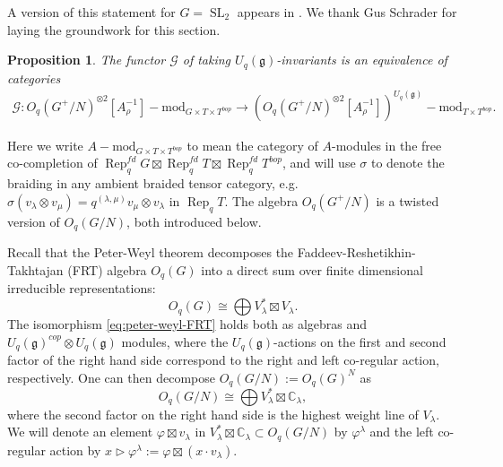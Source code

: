 \documentclass[a4paper]{article}
\numberwithin{equation}{section}
\newtheorem{proposition}[counter]{Proposition}
\newcommand{\1}{{\mathrm{1}\mkern-4mu{\mathchoice{}{}{\mskip-0.5mu}{\mskip-1mu}}\mathrm{l}}}
\DeclareMathOperator{\Rep}{Rep}
\DeclareMathOperator{\SL}{SL}
\newcommand{\g}{\mathfrak{g}}
\renewcommand{\mod}{\mathrm{mod}}
\begin{document}
A version of this statement for $G = \SL_2$ appears in \cite[Theorem 3.63]{JLSS2021}. We thank Gus Schrader for laying the groundwork for this section.
\begin{proposition}\label{prop:G-invariants-equivalence}
    The functor $\mathcal{G}$ of taking $U_q(\g)$-invariants is an equivalence of categories
    \begin{equation}
        \begin{aligned}
        \mathcal{G}: O_q(G^+/N)^{\otimes2}[A_\rho^{-1}]-\mod_{G\times T\times T^{bop}} \to  (O_q(G^+/N)^{\otimes2}[A_\rho^{-1}])^{U_q(\g)}-\mod_{T\times T^{bop}}.
    \end{aligned}
    \end{equation}
\end{proposition}
Here we write $A-\mod_{G\times T \times T^{bop}}$ to mean the category of $A$-modules in the free co-completion of $\Rep
_q^{fd}G\boxtimes \Rep_q^{fd}T \boxtimes \Rep_q^{fd}T^{bop}$, and will use $\sigma$ to denote the braiding in any ambient braided tensor category, e.g. $\sigma(v_\lambda \otimes v_\mu) = q^{(\lambda,\mu)}v_\mu \otimes v_\lambda$ in $\Rep_qT$.
The algebra $O_q(G^+/N)$ is a twisted version of $O_q(G/N)$, both introduced below.

Recall that the Peter-Weyl theorem decomposes the Faddeev-Reshetikhin-Takhtajan (FRT) algebra $O_q(G)$ into a direct sum over finite dimensional irreducible representations:
\begin{equation}\label{eq:peter-weyl-FRT}
     O_q(G) \cong \bigoplus V_\lambda^* \boxtimes V_\lambda.
\end{equation}
The isomorphism \eqref{eq:peter-weyl-FRT} holds both as algebras and $U_q(\g)^{cop}\otimes U_q(\g)$ modules, where the $U_q(\g)$-actions on the first and second factor of the right hand side correspond to the right and left co-regular action, respectively.
One can then decompose $O_q(G/N) := O_q(G)^N$ as
\begin{equation}
    O_q(G/N) \cong \bigoplus V_\lambda^* \boxtimes \mathbb{C}_\lambda,
\end{equation} where the second factor on the right hand side is the highest weight line of $V_\lambda$. 
We will denote an element $\varphi \boxtimes v_\lambda$ in $V_\lambda^* \boxtimes \mathbb{C}_\lambda \subset O_q(G/N)$ by $\varphi^\lambda$ and the left co-regular action by $x \rhd \varphi^\lambda := \varphi \boxtimes (x \cdot v_\lambda)$. 
\end{document}
